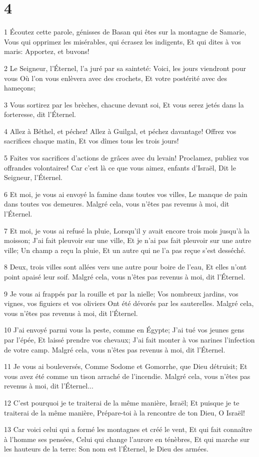 \chapter{4}

\par 1 Écoutez cette parole, génisses de Basan qui êtes sur la montagne de Samarie, Vous qui opprimez les misérables, qui écrasez les indigents, Et qui dites à vos maris: Apportez, et buvons!
\par 2 Le Seigneur, l'Éternel, l'a juré par sa sainteté: Voici, les jours viendront pour vous Où l'on vous enlèvera avec des crochets, Et votre postérité avec des hameçons;
\par 3 Vous sortirez par les brèches, chacune devant soi, Et vous serez jetés dans la forteresse, dit l'Éternel.
\par 4 Allez à Béthel, et péchez! Allez à Guilgal, et péchez davantage! Offrez vos sacrifices chaque matin, Et vos dîmes tous les trois jours!
\par 5 Faites vos sacrifices d'actions de grâces avec du levain! Proclamez, publiez vos offrandes volontaires! Car c'est là ce que vous aimez, enfants d'Israël, Dit le Seigneur, l'Éternel.
\par 6 Et moi, je vous ai envoyé la famine dans toutes vos villes, Le manque de pain dans toutes vos demeures. Malgré cela, vous n'êtes pas revenus à moi, dit l'Éternel.
\par 7 Et moi, je vous ai refusé la pluie, Lorsqu'il y avait encore trois mois jusqu'à la moisson; J'ai fait pleuvoir sur une ville, Et je n'ai pas fait pleuvoir sur une autre ville; Un champ a reçu la pluie, Et un autre qui ne l'a pas reçue s'est desséché.
\par 8 Deux, trois villes sont allées vers une autre pour boire de l'eau, Et elles n'ont point apaisé leur soif. Malgré cela, vous n'êtes pas revenus à moi, dit l'Éternel.
\par 9 Je vous ai frappés par la rouille et par la nielle; Vos nombreux jardins, vos vignes, vos figuiers et vos oliviers Ont été dévorés par les sauterelles. Malgré cela, vous n'êtes pas revenus à moi, dit l'Éternel.
\par 10 J'ai envoyé parmi vous la peste, comme en Égypte; J'ai tué vos jeunes gens par l'épée, Et laissé prendre vos chevaux; J'ai fait monter à vos narines l'infection de votre camp. Malgré cela, vous n'êtes pas revenus à moi, dit l'Éternel.
\par 11 Je vous ai bouleversés, Comme Sodome et Gomorrhe, que Dieu détruisit; Et vous avez été comme un tison arraché de l'incendie. Malgré cela, vous n'êtes pas revenus à moi, dit l'Éternel...
\par 12 C'est pourquoi je te traiterai de la même manière, Israël; Et puisque je te traiterai de la même manière, Prépare-toi à la rencontre de ton Dieu, O Israël!
\par 13 Car voici celui qui a formé les montagnes et créé le vent, Et qui fait connaître à l'homme ses pensées, Celui qui change l'aurore en ténèbres, Et qui marche sur les hauteurs de la terre: Son nom est l'Éternel, le Dieu des armées.

